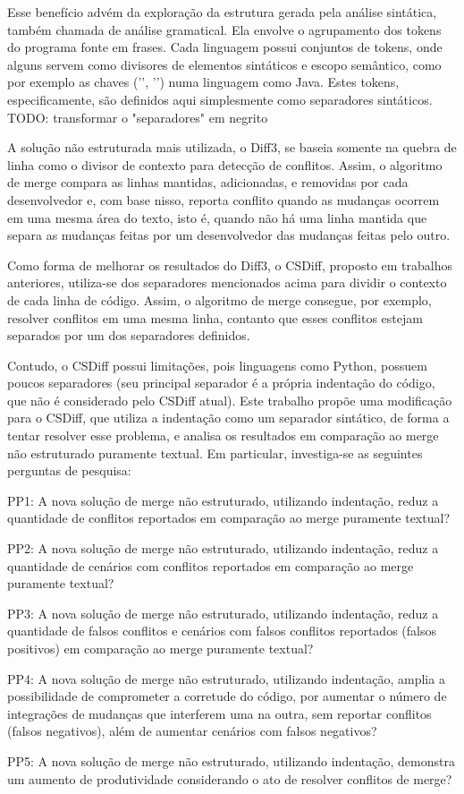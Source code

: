Esse benefício advém da exploração da estrutura gerada pela análise sintática,
também chamada de análise gramatical. Ela envolve o agrupamento dos tokens do programa fonte em frases.
Cada linguagem possui conjuntos de tokens, onde alguns servem como divisores de elementos sintáticos e escopo semântico,
como por exemplo as chaves ('{', '}') numa linguagem como Java. Estes tokens,
especificamente, são definidos aqui simplesmente como separadores sintáticos. TODO: transformar o "separadores" em negrito

A solução não estruturada mais utilizada, o Diff3, se baseia somente na quebra de linha como o divisor de contexto para
detecção de conflitos. Assim, o algoritmo de merge compara as linhas mantidas, adicionadas, e removidas por cada desenvolvedor
e, com base nisso, reporta conflito quando as mudanças ocorrem em uma mesma área do texto, isto é,
quando não há uma linha mantida que separa as mudanças feitas por um desenvolvedor das mudanças feitas pelo outro.

Como forma de melhorar os resultados do Diff3, o CSDiff, proposto em trabalhos anteriores, utiliza-se dos separadores
mencionados acima para dividir o contexto de cada linha de código. Assim, o algoritmo de merge consegue, por exemplo, resolver
conflitos em uma mesma linha, contanto que esses conflitos estejam separados por um dos separadores definidos.

Contudo, o CSDiff possui limitações, pois linguagens como Python, possuem poucos separadores (seu principal separador
é a própria indentação do código, que não é considerado pelo CSDiff atual). Este trabalho propõe uma modificação
para o CSDiff, que utiliza a indentação como um separador sintático, de forma a tentar
resolver esse problema, e analisa os resultados em comparação ao merge não estruturado puramente textual.
Em particular, investiga-se as seguintes perguntas de pesquisa:

\begin{compactenum}[1)]
	\item PP1: A nova solução de merge não estruturado, utilizando indentação,
	reduz a quantidade de conflitos reportados em comparação ao merge puramente textual?
	\item PP2: A nova solução de merge não estruturado, utilizando indentação,
	reduz a quantidade de cenários com conflitos reportados em comparação ao merge puramente textual?
	\item PP3: A nova solução de merge não estruturado, utilizando indentação,
	reduz a quantidade de falsos conflitos e cenários com falsos conflitos reportados (falsos positivos) em comparação ao merge puramente textual?
	\item PP4: A nova solução de merge não estruturado, utilizando indentação,
	amplia a possibilidade de comprometer a corretude do código, por aumentar o número de integrações de mudanças que interferem uma na outra, sem reportar conflitos (falsos negativos), além de aumentar cenários com falsos negativos?
	\item PP5: A nova solução de merge não estruturado, utilizando indentação,
	demonstra um aumento de produtividade considerando o ato de resolver conflitos de merge?
\end{compactenum}

